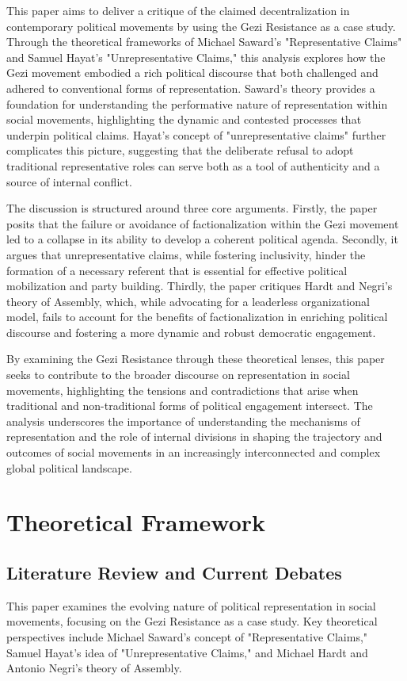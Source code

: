 This paper aims to deliver a critique of the claimed decentralization in contemporary political movements by using the Gezi Resistance as a case study. Through the theoretical frameworks of Michael Saward's "Representative Claims" and Samuel Hayat's "Unrepresentative Claims," this analysis explores how the Gezi movement embodied a rich political discourse that both challenged and adhered to conventional forms of representation. Saward’s theory provides a foundation for understanding the performative nature of representation within social movements, highlighting the dynamic and contested processes that underpin political claims. Hayat’s concept of "unrepresentative claims" further complicates this picture, suggesting that the deliberate refusal to adopt traditional representative roles can serve both as a tool of authenticity and a source of internal conflict.

The discussion is structured around three core arguments. Firstly, the paper posits that the failure or avoidance of factionalization within the Gezi movement led to a collapse in its ability to develop a coherent political agenda. Secondly, it argues that unrepresentative claims, while fostering inclusivity, hinder the formation of a necessary referent that is essential for effective political mobilization and party building. Thirdly, the paper critiques Hardt and Negri’s theory of Assembly, which, while advocating for a leaderless organizational model, fails to account for the benefits of factionalization in enriching political discourse and fostering a more dynamic and robust democratic engagement.

By examining the Gezi Resistance through these theoretical lenses, this paper seeks to contribute to the broader discourse on representation in social movements, highlighting the tensions and contradictions that arise when traditional and non-traditional forms of political engagement intersect. The analysis underscores the importance of understanding the mechanisms of representation and the role of internal divisions in shaping the trajectory and outcomes of social movements in an increasingly interconnected and complex global political landscape.

\chapter{Theoretical Framework}

\section{Literature Review and Current Debates}
This paper examines the evolving nature of political representation in social movements, focusing on the Gezi Resistance as a case study. Key theoretical perspectives include Michael Saward's concept of "Representative Claims," Samuel Hayat's idea of "Unrepresentative Claims," and Michael Hardt and Antonio Negri's theory of Assembly.

